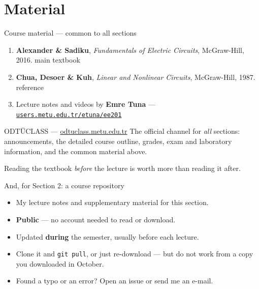 \documentclass[11pt,aspectratio=169]{beamer}
\newcommand{\mysection}{Section 2}
\newcommand{\notesrepo}{https://github.com/mertankarali/Lecture-Notes/tree/master/METU-EE201}
\newcommand{\notesrepotext}{github.com/mertankarali/Lecture-Notes}
\newcommand{\odtuclass}{https://odtuclass.metu.edu.tr}
\newcommand{\tunanotes}{https://users.metu.edu.tr/etuna/ee201/}
\newcommand{\tunanotestext}{users.metu.edu.tr/etuna/ee201}
\begin{document}
\section{Material}
\begin{frame}{Course material --- common to all sections}
  \begin{enumerate}
    \item \textbf{Alexander \& Sadiku}, \emph{Fundamentals of Electric Circuits},
          McGraw-Hill, 2016. \hfill \alert{main textbook}
    \item \textbf{Chua, Desoer \& Kuh}, \emph{Linear and Nonlinear Circuits},
          McGraw-Hill, 1987. \hfill reference
    \item Lecture notes and videos by \textbf{Emre Tuna} ---
          \href{\tunanotes}{\texttt{\tunanotestext}}
  \end{enumerate}
  \vfill
  \begin{block}{ODTÜCLASS --- \href{\odtuclass}{odtuclass.metu.edu.tr}}
    The official channel for \emph{all} sections: announcements, the detailed course outline,
    grades, exam and laboratory information, and the common material above.
  \end{block}
  \vfill
  \centering\small\color{metugray}
  Reading the textbook \emph{before} the lecture is worth more than reading it after.
\end{frame}

\begin{frame}{And, for \mysection: a course repository}
  \vfill
  \begin{center}
  \end{center}
  \vfill
  \begin{itemize}
    \item My lecture notes and supplementary material for this section.
    \item \textbf{Public} --- no account needed to read or download.
    \item Updated \textbf{during} the semester, usually before each lecture.
    \item Clone it and \texttt{git pull}, or just re-download --- but do not work from a copy
          you downloaded in October.
    \item Found a typo or an error? Open an issue or send me an e-mail.
  \end{itemize}
\end{frame}
\end{document}
